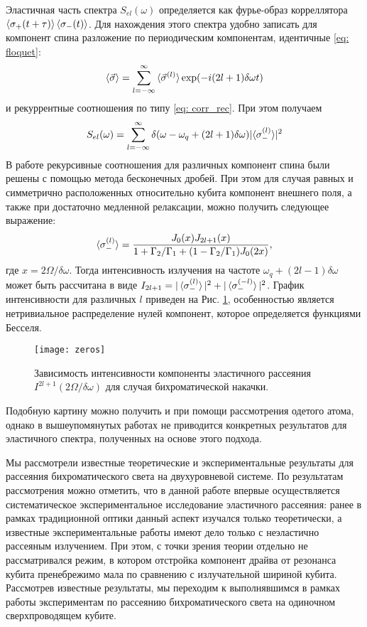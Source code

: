 Эластичная часть спектра $S_{el}(\omega)$ определяется как фурье-образ корреллятора $\braket{\sigma_+(t+\tau)}\braket{\sigma_-(t)}$. Для нахождения этого спектра удобно записать для компонент спина разложение по периодическим компонентам, идентичные \eqref{eq: floquet}:
\begin{equation}
\braket{\vec{\sigma}}  = \sum_{l=-\infty}^{\infty}\braket{\vec{\sigma}^{(l)}}\exp(-i(2l+1)\delta\omega t)
\end{equation} и рекуррентные соотношения по типу \eqref{eq: corr_rec}. При этом получаем
\begin{equation}
S_{el}(\omega) = \sum_{l=-\infty}^{\infty}\delta(\omega-\omega_q+(2l+1)\delta\omega)|\!\braket{\sigma_-^{(l)}}\!|^2
\end{equation}
В работе \cite{Ryuten} рекурсивные соотношения для различных компонент спина были решены с помощью метода бесконечных дробей. При этом для случая равных и симметрично расположенных относительно кубита компонент внешнего поля, а также при достаточно медленной релаксации, можно получить следующее выражение:
\begin{equation}
\braket{\sigma_-^{(l)}} = \frac{J_0(x)J_{2l+1}(x)}{1+\Gamma_2/\Gamma_1+ (1-\Gamma_2/\Gamma_1)J_0(2x)},
\end{equation}
где $x=2\Omega/\delta\omega$.  Тогда интенсивность излучения на частоте $\omega_q + (2l-1)\delta\omega$ может быть рассчитана в виде $I_{2l+1} = |\braket{\sigma_-^{(l)}}|^2 + |\braket{\sigma_-^{(-l)}}|^2$. График интенсивности для различных $l$ приведен на Рис. \ref{fig: zeros}, особенностью является нетривиальное распределение нулей компонент, которое определяется функциями Бесселя. 
\begin{figure}[h]
	\centering
	\texttt{[image: zeros]}
	\caption[Зависимость компонент эластичного рассеяния $I^{2l+1}(2\Omega/\delta\omega)$ для бихроматической накачки.]{Зависимость интенсивности компоненты эластичного рассеяния $I^{2l+1}(2\Omega/\delta\omega)$ для случая бихроматической накачки.}
	\label{fig: zeros}
\end{figure}
Подобную картину можно получить и при помощи рассмотрения одетого атома, однако в вышеупомянутых работах не приводится конкретных результатов для эластичного спектра, полученных на основе этого подхода. 

Мы рассмотрели известные теоретические и экспериментальные результаты для рассеяния бихроматического света на двухуровневой системе. По результатам рассмотрения можно отметить, что в данной работе впервые осуществляется систематическое экспериментальное исследование эластичного рассеяния: ранее в рамках традиционной оптики данный аспект изучался только теоретически, а известные экспериментальные работы \cite{Chakmakjian:88,Zhu_experiment} имеют дело только с неэластично рассеяным излучением. При этом, с точки зрения теории отдельно не рассматривался режим, в котором отстройка компонент драйва от резонанса кубита пренебрежимо мала по сравнению с излучательной шириной кубита.  Рассмотрев известные результаты, мы переходим к выполнявшимся в рамках работы экспериментам по рассеянию бихроматического света на одиночном сверхпроводящем кубите.
